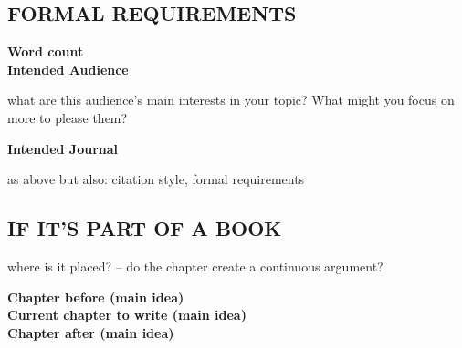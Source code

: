 \documentclass{article}
\begin{document}
\begin{minipage}[t]{0.45\textwidth}

\subsection*{\MakeUppercase{Formal requirements}}
\textbf{Word count}\\[1em]

\textbf{Intended Audience}
{\scriptsize what are this audience's main interests in your topic? What might you focus on more to please them?

}\vspace{2cm}

\textbf{Intended Journal}
{\scriptsize as above but also: citation style, formal requirements

}
\vspace{2cm}


\begin{tcolorbox}\subsection*{\MakeUppercase{if it's part of a book}}
{\scriptsize where is it placed? -- do the chapter create a continuous argument?

}\vspace{0.5em}

\textbf{Chapter before (main idea)}\\[1cm]
\textbf{Current chapter to write (main idea)}\\[1cm]
\textbf{Chapter after (main idea)}\\[1cm]

\end{tcolorbox}

\end{minipage}\hfill
\end{document}
